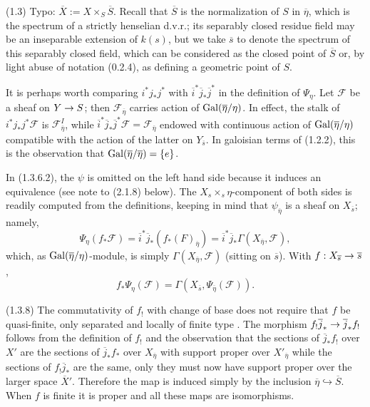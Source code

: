 \documentclass[deligne.tex]{subfiles}
\begin{document}
(1.3) Typo: $\overline X:=X\times_S\overline S$.
Recall that $\overline S$ is the normalization of $S$ in
$\overline\eta$, which is the spectrum of a strictly henselian d.v.r.; 
its separably closed residue field may be
an inseparable extension of $k(s)$, but we take $\overline s$ to denote the
spectrum of this separably closed field, which can be considered as the
closed point of $\overline S$ or, by light abuse of notation (0.2.4), as
defining a geometric point of $S$.

It is perhaps worth comparing $i^*j_*j^*$ with
$\overline i^*\overline j_*\overline j^*$ in the definition of $\Psi_\eta$.
Let $\mathcal F$ be a sheaf on $Y\rightarrow S$;
then $\mathcal F_{\overline\eta}$ carries action of
$\operatorname{Gal}(\overline\eta/\eta)$. In effect, the stalk of
$i^*j_*j^*\mathcal F$ is $\mathcal F_{\overline\eta}^I$, 
while $\overline i^*\overline j_*\overline j^*\mathcal F=\mathcal F_{\overline\eta}$ endowed with continuous action of
$\operatorname{Gal}(\overline\eta/\eta)$ compatible with the action of the latter on
$Y_{\overline s}$. In galoisian terms of (1.2.2), this is the 
observation that $\operatorname{Gal}(\overline\eta/\overline\eta)=\{e\}$.

In (1.3.6.2), the $\psi$ is omitted on the left hand side because it
induces an equivalence (see note to (2.1.8) below).
The $X_s\times_s\eta$-component of both sides is readily computed from
the definitions, keeping in mind that $\psi_{\overline\eta}$ is a sheaf
on $X_{\overline s}$; namely,
\begin{equation*}
	\Psi_{\eta}(f_*\mathcal F)
	=\overline i^*\overline j_*(f_*(F)_{\overline\eta})
	=\overline i^*\overline j_*\Gamma(X_{\overline\eta},\mathcal F),
\end{equation*}
which, as $\operatorname{Gal}(\overline\eta/\eta)$-module, is simply
$\Gamma(X_{\overline\eta},\mathcal F)$ (sitting on $\overline s$).
With $f:X_{\overline s}\rightarrow\overline s$,
\begin{equation*}
	f_*\Psi_{\eta}(\mathcal F)
	=\Gamma(X_{\overline s},\Psi_{\overline\eta}(\mathcal F)).
\end{equation*}


(1.3.8) The commutativity of $f_!$ with change of base does not require
that $f$ be quasi-finite, only separated and locally of finite type
\cite[Exp. XVII 6.1.4]{SGAA}.
The morphism $f_!\overline j_*\rightarrow\overline j_*f_!$ follows from
the definition of $f_!$ \cite[Exp. XVII 6.1.2]{SGAA} and the observation
that the sections of $\overline j_*f_!$ over $X'$ are the sections of
$\overline j_*f_*$ over $X_{\overline\eta}$ with support proper over 
$X'_{\overline\eta}$ while the sections of $f_!\overline j_*$ are the same,
only they must now have support proper over the larger space $\overline X'$. Therefore the map is induced simply by the inclusion
$\overline\eta\hookrightarrow\overline S$.
When $f$ is finite it is proper and all these maps are isomorphisms.
\end{document}

